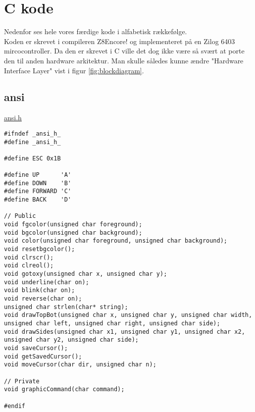 \chapter{C kode}
\label{C kode}

Nedenfor ses hele vores færdige kode i alfabetisk rækkefølge. \\
Koden er skrevet i compileren Z8Encore! og implementeret på en Zilog 6403 mircocontroller. Da den er skrevet i C ville det dog ikke være så svært at porte den til anden hardware arkitektur. Man skulle således kunne ændre "Hardware Interface Layer" vist i figur \ref{fig:blockdiagram}.

\section{ansi}
\label{ansi}

\underline{ansi.h}
\begin{lstlisting}
#ifndef _ansi_h_
#define _ansi_h_

#define ESC 0x1B

#define UP		'A'
#define DOWN	'B'
#define FORWARD	'C'
#define BACK	'D'

// Public
void fgcolor(unsigned char foreground);
void bgcolor(unsigned char background);
void color(unsigned char foreground, unsigned char background);
void resetbgcolor();
void clrscr();
void clreol();
void gotoxy(unsigned char x, unsigned char y);
void underline(char on);
void blink(char on);
void reverse(char on);
unsigned char strlen(char* string);
void drawTopBot(unsigned char x, unsigned char y, unsigned char width, unsigned char left, unsigned char right, unsigned char side);
void drawSides(unsigned char x1, unsigned char y1, unsigned char x2, unsigned char y2, unsigned char side);
void saveCursor();
void getSavedCursor();
void moveCursor(char dir, unsigned char n);

// Private
void graphicCommand(char command);

#endif
\end{lstlisting}

